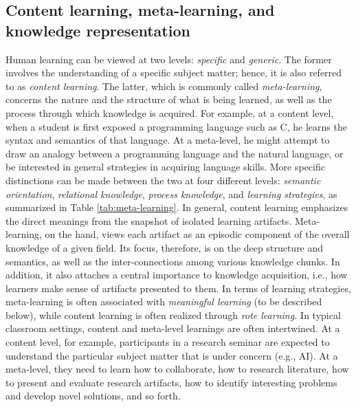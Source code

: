 \subsection{Content learning, meta-learning, and knowledge representation}

Human learning can be viewed at two levels: {\it specific\/} and {\it
generic\/}. The former involves the understanding of a specific subject
matter; hence, it is also referred to as {\it content learning\/}. The
latter, which is commonly called {\it meta-learning\/}, concerns the nature
and the structure of what is being learned, as well as the process through
which knowledge is acquired. For example, at a content level, when a
student is first exposed a programming language such as C, he learns the
syntax and semantics of that language. At a meta-level, he might attempt to
draw an analogy between a programming language and the natural language, or
be interested in general strategies in acquiring language skills.  More
specific distinctions can be made between the two at four different levels:
{\it semantic orientation\/}, {\it relational knowledge\/}, {\it process
knowledge\/}, and {\it learning strategies\/}, as summarized in Table
\ref{tab:meta-learning}.  In general, content learning emphasizes the
direct meanings from the snapshot of isolated learning artifacts.
Meta-learning, on the hand, views each artifact as an episodic component of
the overall knowledge of a given field. Its focus, therefore, is on the
deep structure and semantics, as well as the inter-connections among
various knowledge chunks. In addition, it also attaches a central
importance to knowledge acquisition, i.e., how learners make sense of
artifacts presented to them.  In terms of learning strategies,
meta-learning is often associated with {\it meaningful learning\/} (to be
described below), while content learning is often realized through {\it rote
learning.\/}  In typical classroom settings, content and meta-level
learnings are often intertwined.  At a content level, for example,
participants in a research seminar are expected to understand the
particular subject matter that is under concern (e.g., AI). At a
meta-level, they need to learn how to collaborate, how to research
literature, how to present and evaluate research artifacts, how to identify
interesting problems and develop novel solutions, and so forth.


